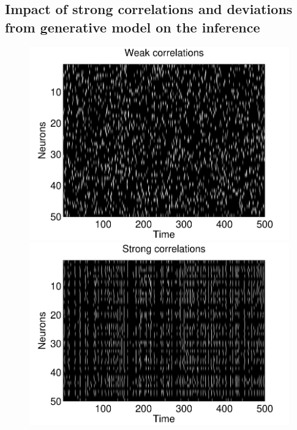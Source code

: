\documentclass[aoas,preprint]{imsart}
\begin{document}
\subsection{Impact of strong correlations and deviations from
  generative model on the inference}
\label{sec:impact-strong-corr}

\begin{figure}[t!]
\centering
\begin{minipage}[c]{0.45\hsize}
\includegraphics[width=\hsize]{../figs/Figure7b_raster_weak}
\end{minipage}
\begin{minipage}[c]{0.45\hsize}
\includegraphics[width=\hsize]{../figs/Figure7a_raster_strong}
\end{minipage}
\begin{minipage}[c]{0.45\hsize}

\end{minipage}
\end{figure}
\end{document}
